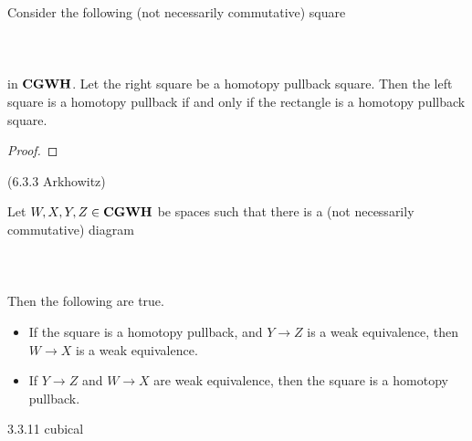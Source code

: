 \documentclass[a4paper]{article}
\begin{document}
\begin{prp}{}{} Consider the following (not necessarily commutative) square \\~\\
\\~\\
in $\bold{CGWH}$. Let the right square be a homotopy pullback square. Then the left square is a homotopy pullback if and only if the rectangle is a homotopy pullback square. \tcbline
\begin{proof}

\end{proof}
\end{prp} (6.3.3 Arkhowitz)

\begin{prp}{}{} Let $W,X,Y,Z\in\bold{CGWH}$ be spaces such that there is a (not necessarily commutative) diagram \\~\\
\\~\\
Then the following are true. 
\begin{itemize}
\item If the square is a homotopy pullback, and $Y\to Z$ is a weak equivalence, then $W\to X$ is a weak equivalence. 
\item If $Y\to Z$ and $W\to X$ are weak equivalence, then the square is a homotopy pullback. 
\end{itemize} 3.3.11 cubical 
\end{prp}
\end{document}
